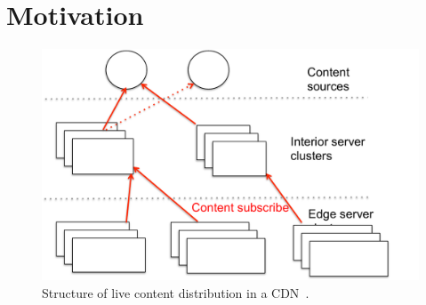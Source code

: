 \section{Motivation}

\begin{figure}[t]
\centering
\includegraphics[width=0.90\columnwidth]{figures/cdn}
\caption{Structure of live content distribution in a CDN~\cite{akamai-live}.}
\label{fig:cdn}
\end{figure}

